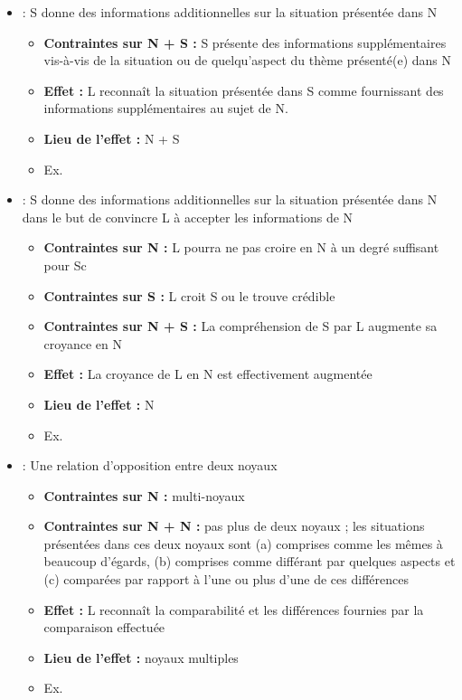 \documentclass{KodeBook}
\begin{document}
\begin{itemize}
	\item {} :  S donne des informations additionnelles sur la situation présentée dans N
	\begin{itemize}
		\item \textbf{Contraintes sur N + S :} S présente des informations supplémentaires vis-à-vis de la situation ou de quelqu'aspect du thème présenté(e) dans N 
		\item \textbf{Effet :}  L reconnaît la situation présentée dans S comme fournissant des informations supplémentaires au sujet de N. 
		\item \textbf{Lieu de l'effet :} N + S
		\item Ex. 
	\end{itemize}

	\item {} :  S donne des informations additionnelles sur la situation présentée dans N dans le but de convincre L à accepter les informations de N
	\begin{itemize}
		\item \textbf{Contraintes sur N :} L pourra ne pas croire en N à un degré suffisant pour Sc
		\item \textbf{Contraintes sur S :} L croit S ou le trouve crédible
		\item \textbf{Contraintes sur N + S :} La compréhension de S par L augmente sa croyance en N
		\item \textbf{Effet :}  La croyance de L en N est effectivement augmentée
		\item \textbf{Lieu de l'effet :} N
		\item Ex. 
	\end{itemize}

	\item {} :  Une relation d'opposition entre deux noyaux
	\begin{itemize}
		\item \textbf{Contraintes sur N :} multi-noyaux
		\item \textbf{Contraintes sur N + N :} pas plus de deux noyaux ; les situations présentées dans ces deux noyaux sont (a) comprises comme les mêmes à beaucoup d'égards, (b) comprises comme différant par quelques aspects et (c) comparées par rapport à l'une ou plus d'une de ces différences
		\item \textbf{Effet :}  L reconnaît la comparabilité et les différences fournies par la comparaison effectuée
		\item \textbf{Lieu de l'effet :} noyaux multiples
		\item Ex. 
	\end{itemize}


\end{itemize}
\end{document}
